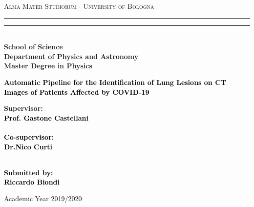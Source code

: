 \begin{titlepage}
%
%
%
%
\begin{center}
{{\Large{\textsc{Alma Mater Studiorum $\cdot$ University of  Bologna}}}} 
\rule[0.1cm]{15.8cm}{0.1mm}
\rule[0.5cm]{15.8cm}{0.6mm}
\\\vspace{3mm}
{\small{\bf School of Science \\
Department of Physics and Astronomy\\
Master Degree in Physics}}
\end{center}

\vspace{23mm}

\begin{center}\textcolor{black}{
%
%
{\LARGE{\bf Automatic Pipeline for the Identification of Lung Lesions on CT Images of Patients Affected by COVID-19}}\\
}\end{center}

\vspace{50mm} \par \noindent

\begin{minipage}[t]{0.49\textwidth}
%
%
{\large{\bf Supervisor: \vspace{2mm}\\\textcolor{black}{
Prof. Gastone Castellani}\\\\
%
%
%
\textcolor{black}{
\bf Co-supervisor:\\
\vspace{5mm}
Dr.Nico Curti}}}\\\\
\end{minipage}

%
\hfill
%
\begin{minipage}[t]{0.47\textwidth}\raggedleft \textcolor{black}{
{\large{\bf Submitted by:
\vspace{2mm}\\
%
%
\textcolor{black}{
Riccardo Biondi}}}
}
\end{minipage}

\vspace{40mm}

\begin{center}
%
%
Academic Year \textcolor{black}{ 2019/2020}
\end{center}

\end{titlepage}


